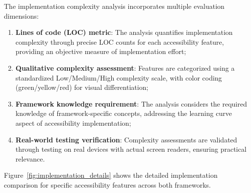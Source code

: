\FloatBarrier

The implementation complexity analysis incorporates multiple evaluation dimensions:

\begin{enumerate}
    \item \textbf{Lines of code (LOC) metric}: The analysis quantifies implementation complexity through precise LOC counts for each accessibility feature, providing an objective measure of implementation effort;
    
    \item \textbf{Qualitative complexity assessment}: Features are categorized using a standardized Low/Medium/High complexity scale, with color coding (green/yellow/red) for visual differentiation;
    
    \item \textbf{Framework knowledge requirement}: The analysis considers the required knowledge of framework-specific concepts, addressing the learning curve aspect of accessibility implementation;
    
    \item \textbf{Real-world testing verification}: Complexity assessments are validated through testing on real devices with actual screen readers, ensuring practical relevance.
\end{enumerate}

Figure~\ref{fig:implementation_details} shows the detailed implementation comparison for specific accessibility features across both frameworks.

